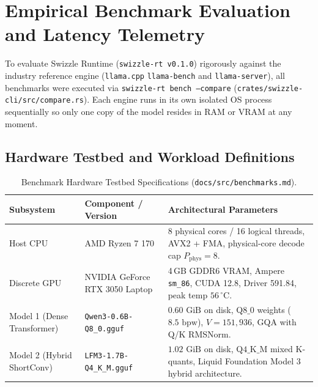 \documentclass[10pt,a4paper]{article}
\theoremstyle{swzstyle}
\newcommand{\code}[1]{\texttt{#1}}
\begin{document}
\section{Empirical Benchmark Evaluation and Latency Telemetry}

To evaluate Swizzle Runtime (\code{swizzle-rt v0.1.0}) rigorously against the industry reference engine (\code{llama.cpp} \code{llama-bench} and \code{llama-server}), all benchmarks were executed via \code{swizzle-rt bench --compare} (\code{crates/swizzle-cli/src/compare.rs}). Each engine runs in its own isolated OS process sequentially so only one copy of the model resides in RAM or VRAM at any moment.

\subsection{Hardware Testbed and Workload Definitions}

\begin{table}[htbp]
  \centering
  \caption{Benchmark Hardware Testbed Specifications (\texttt{docs/src/benchmarks.md}).}
  \label{tab:testbed_specs}
  \small
  \begin{tabularx}{\textwidth}{@{}llX@{}}
    \toprule
    \sffamily\bfseries Subsystem & \sffamily\bfseries Component / Version & \sffamily\bfseries Architectural Parameters \\
    \midrule
    Host CPU & AMD Ryzen 7 170 & 8 physical cores / 16 logical threads, AVX2 + FMA, physical-core decode cap $P_{\text{phys}}=8$. \\
    Discrete GPU & NVIDIA GeForce RTX 3050 Laptop & 4\,GB GDDR6 VRAM, Ampere \code{sm\_86}, CUDA 12.8, Driver 591.84, peak temp $56\,^\circ\text{C}$. \\
    Model 1 (Dense Transformer) & \code{Qwen3-0.6B-Q8\_0.gguf} & $0.60\text{ GiB}$ on disk, $\text{Q8\_0}$ weights ($8.5\text{ bpw}$), $V = 151,936$, GQA with Q/K RMSNorm. \\
    Model 2 (Hybrid ShortConv) & \code{LFM3-1.7B-Q4\_K\_M.gguf} & $1.02\text{ GiB}$ on disk, $\text{Q4\_K\_M}$ mixed K-quants, Liquid Foundation Model 3 hybrid architecture. \\
    \bottomrule
  \end{tabularx}
\end{table}
\end{document}
